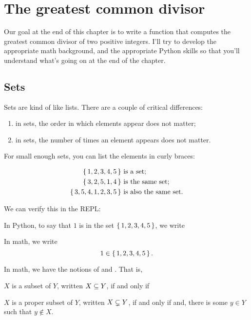 \chapter{The greatest common divisor}

Our goal at the end of this chapter is to write a function that
computes the greatest common divisor of two positive integers. I'll
try to develop the appropriate math background, and the appropriate
Python skills so that you'll understand what's going on at the end of
the chapter.

\section{Sets}

Sets are kind of like lists. There are a couple of critical
differences:

\begin{enumerate}
\item in sets, the order in which elements appear does not matter;
\item in sets, the number of times an element appears does not matter.
\end{enumerate}

For small enough sets, you can list the elements in curly braces:

\begin{align*}
  \left\{\, 1,2,3,4,5 \,\right\} & \text{ is a set;} \\
  \left\{\, 3,2,5,1,4 \,\right\} & \text{ is the same set;} \\
  \left\{\, 3,5,4,1,2,3,5 \,\right\} & \text{ is also the same set.}
\end{align*}

We can verify this in the REPL:


In Python, to say that $1$ is in the set $\left\{\, 1,2,3,4,5 \,\right\}$, we write


In math, we write $$1 \in \left\{\, 1,2,3,4,5 \,\right\}.$$

In math, we have the notions of  and
. That is,

\begin{definition}
  $X$ is a subset of $Y$, written $X \subseteq Y$, if and only if
\end{definition}

\begin{definition}
  $X$ is a proper subset of $Y$, written $X \subsetneq Y$, if and only if
   and, there is some $y \in Y$
  such that $y \notin X$.
\end{definition}

